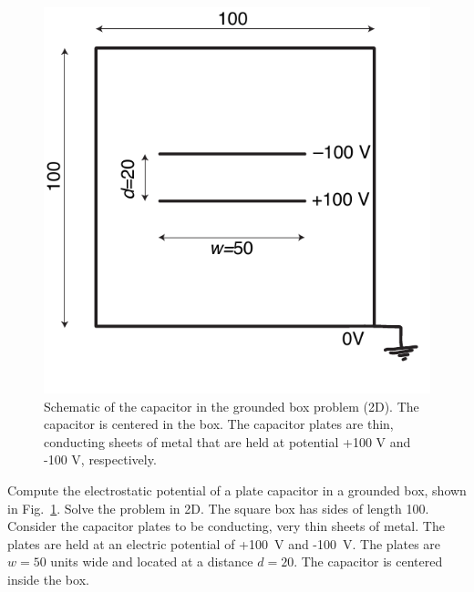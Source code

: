 \documentclass[letterpaper]{scrartcl}
\begin{document}
\begin{figure}[!h]
  \centering
  \includegraphics[width=0.5\linewidth]{CapacitorInBox.pdf}
  \caption{Schematic of the capacitor in the grounded box problem
    (2D). The capacitor is centered in the box. The capacitor plates
    are thin, conducting sheets of metal that are held at potential
    +100 V and -100 V, respectively.}
  \label{fig:capacitor}
\end{figure}

Compute the electrostatic potential of a plate capacitor in a grounded
box, shown in Fig.~\ref{fig:capacitor}. Solve the problem in 2D. The
square box has sides of length 100. Consider the capacitor plates to
be conducting, very thin sheets of metal. The plates are held at an
electric potential of +100~V and -100~V. The plates are $w=50$ units wide
and located at a distance $d=20$. The capacitor is centered inside the
box.
\end{document}
